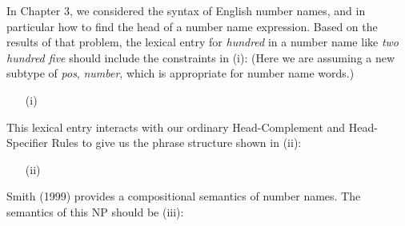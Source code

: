 \documentclass[a4paper,landscape,headrule,footrule,dvips]{foils}
\begin{document}
In  Chapter 3, we considered the
syntax of English number names, and in particular how
to find the head of a number name expression. Based on the
results of that problem, the lexical entry for
{\it hundred} in a number name like {\it two hundred five}
should include the constraints in (i): (Here we are assuming
a new subtype of {\it pos}, {\it number}, which is appropriate
for number name words.)

\begin{itemize}
\item[(i)] 
\end{itemize}

\noindent
This lexical entry interacts with our ordinary Head-Complement
and Head-Specifier Rules to give us the phrase structure shown in
(ii):

\begin{itemize}
\item[(ii)] 
\end{itemize}

Smith (1999) provides a compositional semantics
of number names. The semantics of this NP should be (iii):
\end{document}
